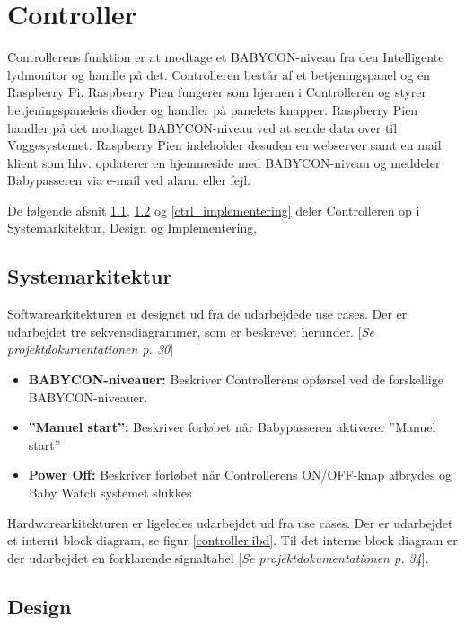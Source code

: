 \chapter{Controller}

Controllerens funktion er at modtage et BABYCON-niveau fra den Intelligente lydmonitor og handle på det. Controlleren består af et betjeningspanel og en Raspberry Pi. Raspberry Pien fungerer som hjernen i Controlleren og styrer betjeningspanelets dioder og handler på panelets knapper. Raspberry Pien handler på det modtaget BABYCON-niveau ved at sende data over \iic til Vuggesystemet. Raspberry Pien indeholder desuden en webserver samt en mail klient som hhv. opdaterer en hjemmeside med BABYCON-niveau og meddeler Babypasseren via e-mail ved alarm eller fejl.

De følgende afsnit \ref{ctrl_sysark}, \ref{ctrl_design} og \ref{ctrl_implementering} deler Controlleren op i Systemarkitektur, Design og Implementering.

\section{Systemarkitektur}
\label{ctrl_sysark}

Softwarearkitekturen er designet ud fra de udarbejdede use cases. Der er udarbejdet tre sekvensdiagrammer, som er beskrevet herunder. [\textit{Se projektdokumentationen p. 30}]

\begin{itemize}
\item \textbf{BABYCON-niveauer:} Beskriver Controllerens opførsel ved de forskellige BABYCON-niveauer.
\item \textbf{''Manuel start'':} Beskriver forløbet når Babypasseren aktiverer ''Manuel start''
\item \textbf{Power Off:} Beskriver forløbet når Controllerens ON/OFF-knap afbrydes og Baby Watch systemet slukkes 
\end{itemize}

Hardwarearkitekturen er ligeledes udarbejdet ud fra use cases. Der er udarbejdet et internt block diagram, se figur \ref{controller:ibd}. Til det interne block diagram er der udarbejdet en forklarende signaltabel [\textit{Se projektdokumentationen p. 34}].



\section{Design}
\label{ctrl_design}

